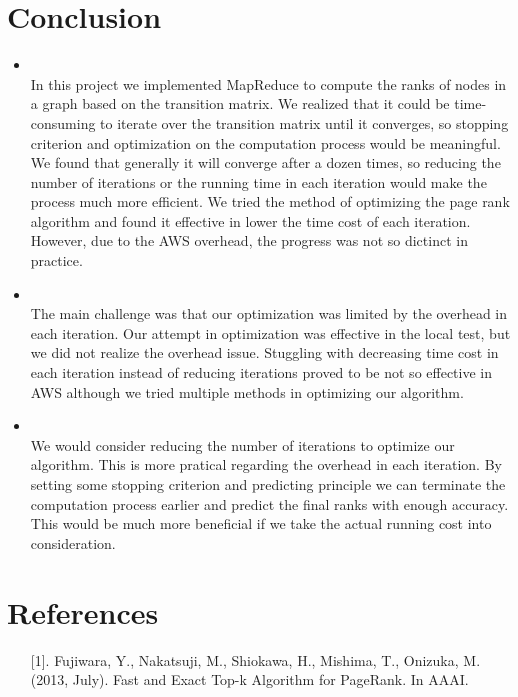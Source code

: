 \section{Conclusion}
\medskip
\begin{itemize}

    \item {} \\
    In this project we implemented MapReduce to compute the ranks of nodes in a graph based on the transition matrix. We realized that it could be time-consuming to iterate over the transition matrix until it converges, so stopping criterion and optimization on the computation process would be meaningful. We found that generally it will converge after a dozen times, so reducing the number of iterations or the running time in each iteration would make the process much more efficient. We tried the method of optimizing the page rank algorithm and found it effective in lower the time cost of each iteration. However, due to the AWS overhead, the progress was not so dictinct in practice.

    \item {} \\
    The main challenge was that our optimization was limited by the overhead in each iteration. Our attempt in optimization was effective in the local test, but we did not realize the overhead issue. Stuggling with decreasing time cost in each iteration instead of reducing iterations proved to be not so effective in AWS although we tried multiple methods in optimizing our algorithm.

    \item {} \\
    We would consider reducing the number of iterations to optimize our algorithm. This is more pratical regarding the overhead in each iteration. By setting some stopping criterion and predicting principle we can terminate the computation process earlier and predict the final ranks with enough accuracy. This would be much more beneficial if we take the actual running cost into consideration.
\end{itemize}

\section{References}
\begin{enumerate}
    \item[] [1]. Fujiwara, Y., Nakatsuji, M., Shiokawa, H., Mishima, T., Onizuka, M. (2013, July). Fast and Exact Top-k Algorithm for PageRank. In AAAI.
\end{enumerate}

